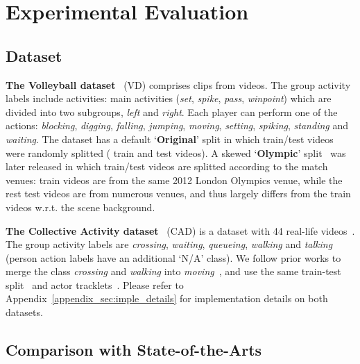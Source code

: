 \documentclass[runningheads]{llncs}
\begin{document}
 
 
\section{Experimental Evaluation}
\subsection{Dataset}
\label{sec:dataset}


\textbf{The Volleyball dataset}~\cite{ibrahim2016hierarchical} (VD) comprises
 clips 
from  
videos.
The group activity labels include  activities: 
 main activities (\textit{set}, \textit{spike}, \textit{pass}, \textit{winpoint}) which are divided into two subgroups, \textit{left} and \textit{right}.
Each player can perform one of the  actions: \textit{blocking}, \textit{digging}, \textit{falling}, \textit{jumping}, \textit{moving}, \textit{setting}, \textit{spiking}, \textit{standing} and \textit{waiting}. The dataset has a default `\textbf{Original}' split in which train/test videos were randomly splitted ( train and  test videos). 
A skewed `\textbf{Olympic}' split~\cite{POGARS} 
was later released in which 
train/test videos are splitted according to the match venues: 
 train videos are from the same
2012 London Olympics venue, while the rest  test videos are from numerous venues, and thus largely differs from the train videos w.r.t. the scene background.


\noindent \textbf{The Collective Activity dataset}~\cite{choi2009they} (CAD) is a dataset with 44 real-life videos~\cite{wu2021comprehensive}. The group activity labels are \textit{crossing}, \textit{waiting}, \textit{queueing}, \textit{walking} and \textit{talking} (person action labels have an additional `N/A' class). 
We follow prior works to merge the class \textit{crossing} and \textit{walking} into \textit{moving}~\cite{yuan2021spatio,wang2017recurrent,PCTDM,higcin}, and use the same train-test split~\cite{yuan2021spatio,arg,stagnet} and actor tracklets~\cite{yuan2021spatio,ssu}.
Please refer to Appendix~\ref{appendix_sec:imple_details} for implementation details on both datasets.  
 




 
 

 
\subsection{Comparison with State-of-the-Arts}
\label{sec:sota_compare} 
\end{document}
